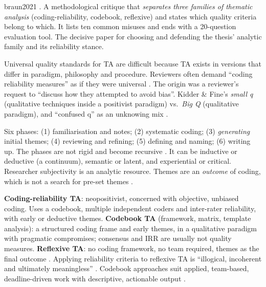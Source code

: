 \begin{papercard}{braun2021}
   . A methodological critique that \emph{separates three families of thematic analysis} (coding-reliability, codebook, reflexive) and states which quality criteria belong to which. It lists ten common misuses and ends with a 20-question evaluation tool. The decisive paper for choosing and defending the thesis' analytic family and its reliability stance.

 Universal quality standards for TA are difficult because TA exists in versions that differ in paradigm, philosophy and procedure. Reviewers often demand ``coding reliability measures'' as if they were universal . The origin was a reviewer's request to ``discuss how they attempted to avoid bias''. Kidder \& Fine's \emph{small q} (qualitative techniques inside a positivist paradigm) vs.\ \emph{Big Q} (qualitative paradigm), and ``confused q'' as an unknowing mix .

 Six phases: (1) familiarisation and notes; (2) systematic coding; (3) \emph{generating} initial themes; (4) reviewing and refining; (5) defining and naming; (6) writing up. The phases are not rigid and become recursive . It can be inductive or deductive (a continuum), semantic or latent, and experiential or critical. Researcher subjectivity is an analytic resource. Themes are an \emph{outcome} of coding, which is not a search for pre-set themes .

 \textbf{Coding-reliability TA}: neopositivist, concerned with objective, unbiased coding. Uses a codebook, multiple independent coders and inter-rater reliability, with early or deductive themes. \textbf{Codebook TA} (framework, matrix, template analysis): a structured coding frame and early themes, in a qualitative paradigm with pragmatic compromises; consensus and IRR are usually not quality measures. \textbf{Reflexive TA}: no coding framework, no team required, themes as the final outcome . Applying reliability criteria to reflexive TA is ``illogical, incoherent and ultimately meaningless'' . Codebook approaches suit applied, team-based, deadline-driven work with descriptive, actionable output .


\end{papercard}
